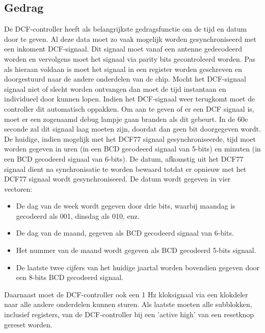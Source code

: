 \subsection{Gedrag}
De DCF-controller heeft als belangrijkste gedragsfunctie om de tijd en datum door te geven. Al deze data moet zo vaak mogelijk worden gesynchroniseerd met een inkoment DCF-signaal. Dit signaal moet vanaf een antenne gedecodeerd worden en vervolgens moet het signaal via parity bits gecontroleerd worden. Pas als hieraan voldaan is moet het signaal in een register worden geschreven en doorgestuurd naar de andere onderdelen van de chip. Mocht het DCF-signaal signaal niet of slecht worden ontvangen dan moet de tijd instantaan en individueel door kunnen lopen. Indien het DCF-signaal weer terugkomt moet de controller dit automatisch oppakken. Om aan te geven of er een  DCF signaal is, moet er een zogenaamd debug lampje gaan branden als dit gebeurt. In de 60e seconde zal dit signaal laag moeten zijn, doordat dan geen bit doorgegeven wordt. \\
De huidige, indien mogelijk met het DCF77 signaal gesynchroniseerde, tijd moet worden gegeven in uren (in een BCD gecodeerd signaal van 5-bits) en minuten (in een BCD gecodeerd signaal van 6-bits). De datum, afkomstig uit het DCF77 signaal dient na synchronisatie te worden bewaard totdat er opnieuw met het DCF77 signaal wordt gesynchroniseerd. De datum wordt gegeven in vier vectoren:
\begin{itemize}[nolistsep]
\item De dag van de week wordt gegeven door drie bits, waarbij maandag is gecodeerd als 001, dinsdag als 010, enz.
\item De dag van de maand, gegeven als BCD gecodeerd signaal van 6-bits.
\item Het nummer van de maand wordt gegeven als BCD gecodeerd 5-bits signaal.
\item De laatste twee cijfers van het huidige jaartal worden bovendien gegeven door een 8-bits BCD gecodeerd signaal.
\end{itemize}
\vspace{0.3cm}
Daarnaast moet de DCF-controller ook een 1 Hz kloksignaal via een klokdeler naar alle andere onderdelen kunnen sturen.
Als laatste moeten alle subblokken, inclusief registers, van de DCF-controller bij een 'active high' van een resetknop gereset worden.